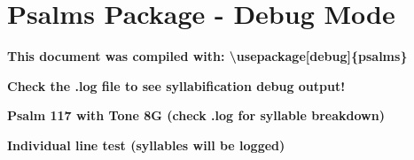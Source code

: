 \documentclass{article}
\begin{document}
\section*{Psalms Package - Debug Mode}

\textbf{This document was compiled with: \textbackslash usepackage[debug]\{psalms\}}

\textbf{Check the .log file to see syllabification debug output!}

\bigskip

\textbf{Psalm 117 with Tone 8G (check .log for syllable breakdown)}


\bigskip

\textbf{Individual line test (syllables will be logged)}

\par
\end{document}
